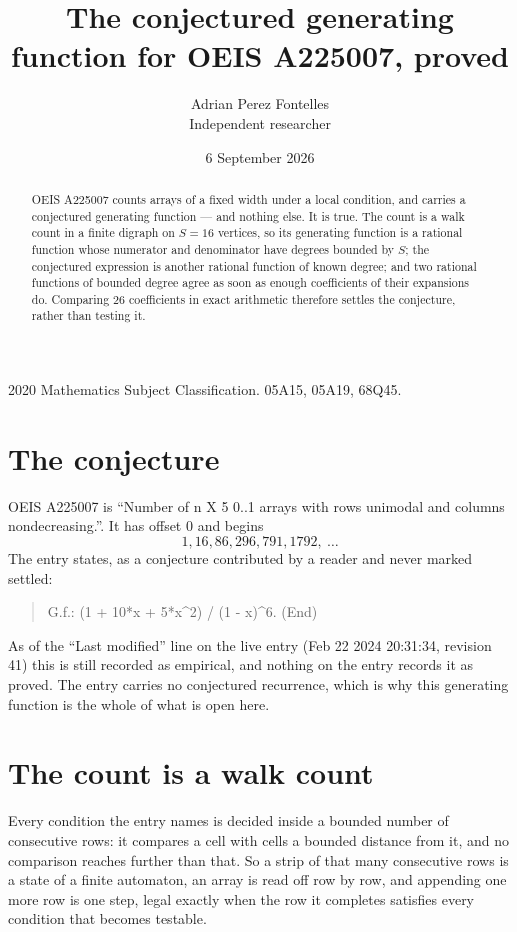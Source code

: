 \documentclass[11pt,a4paper]{article}
\title{The conjectured generating function for OEIS A225007, proved}
\author{Adrian Perez Fontelles\\ \small Independent researcher}
\date{6 September 2026}
\theoremstyle{plain}
\theoremstyle{definition}
\begin{document}
\maketitle

\begin{abstract}
OEIS A225007 counts arrays of a fixed width under a local condition, and carries a conjectured
generating function --- and nothing else. It is true. The count is a walk count in a finite
digraph on $S=16$ vertices, so its generating function is a rational function whose numerator
and denominator have degrees bounded by $S$; the conjectured expression is another rational
function of known degree; and two rational functions of bounded degree agree as soon as enough
coefficients of their expansions do. Comparing $26$ coefficients in exact arithmetic
therefore settles the conjecture, rather than testing it.
\end{abstract}

\noindent\small 2020 Mathematics Subject Classification. 05A15, 05A19, 68Q45.\normalsize

\section{The conjecture}

OEIS A225007 is ``Number of n X 5 0..1 arrays with rows unimodal and columns nondecreasing.''. It has offset $0$ and begins
\[
1, 16, 86, 296, 791, 1792,\ \dots
\]
The entry states, as a conjecture contributed by a reader and never marked settled:
\begin{quote}
G.f.: (1 + 10*x + 5*x\^{}2) / (1 - x)\^{}6. (End)
\end{quote}
As of the ``Last modified'' line on the live entry (Feb 22 2024 20:31:34, revision 41) this is still
recorded as empirical, and nothing on the entry records it as proved. The entry carries no
conjectured recurrence, which is why this generating function is the whole of what is open
here.

\section{The count is a walk count}

Every condition the entry names is decided inside a bounded number of consecutive rows: it
compares a cell with cells a bounded distance from it, and no comparison reaches further than
that. So a strip of that many consecutive rows is a state of a finite automaton, an array is
read off row by row, and appending one more row is one step, legal exactly when the row it
completes satisfies every condition that becomes testable.
\end{document}
